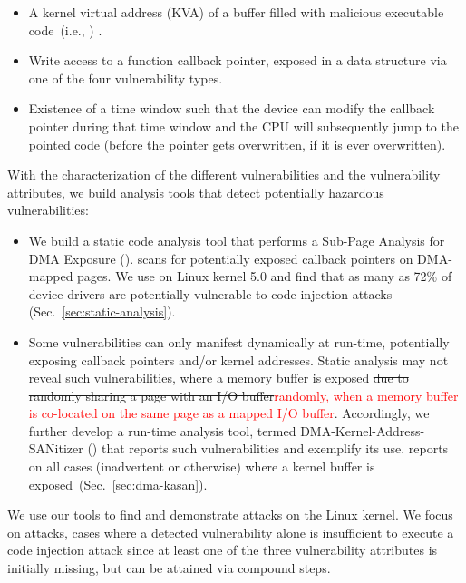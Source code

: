 \begin{itemize}
    \item A kernel virtual address (KVA) of a buffer filled with malicious executable code~(i.e., \mabaf) .
    \item Write access to a function callback pointer, exposed in a data structure via one of the four \subpage vulnerability types. 
    \item Existence of a time window such that the device can modify the callback pointer during that time window and the CPU will subsequently jump to the pointed code (before the pointer gets overwritten, if it is ever overwritten). 
\end{itemize} 

With the characterization of the different \subpage{} vulnerabilities and the vulnerability attributes, we build analysis tools that detect potentially hazardous \subpage{} vulnerabilities:

\begin{itemize}
    \item We build a static code analysis tool that performs a Sub-Page Analysis for DMA Exposure (\tool). \tool scans for potentially exposed callback pointers on DMA-mapped pages. We use \tool on Linux kernel 5.0 and find that as many as 72\% of device drivers are potentially vulnerable to code injection attacks (Sec.~\ref{sec:static-analysis}). 

    \item Some \subpage{} vulnerabilities can only manifest dynamically at run-time, potentially exposing callback pointers and/or kernel addresses. Static analysis may not reveal such vulnerabilities, where a memory buffer is exposed \sout{due to randomly sharing a page with an I/O buffer}\textcolor{red}{randomly, when a memory buffer is co-located on the same page as a mapped I/O buffer}. Accordingly, we further develop a run-time analysis tool, termed DMA-Kernel-Address-SANitizer (\dkasan) that reports such vulnerabilities and exemplify its use. \dkasan reports on all cases (inadvertent or otherwise) where a kernel buffer is exposed~(Sec.~\ref{sec:dma-kasan}).
\end{itemize}

We use our tools to find and demonstrate attacks on the Linux kernel. We focus on \compound attacks, cases where a detected \subpage vulnerability alone is insufficient to execute a code injection attack since at least one of the three vulnerability attributes is initially missing, but can be attained via compound steps. 

